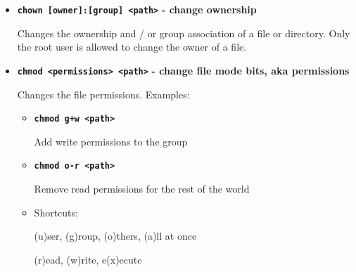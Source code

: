 \documentclass[aspectratio=1610]{beamer}
\newcommand\curtitle{}
\newenvironment{shells}[1]{
    \begin{tikzpicture}[codebox/.append style={text width=#1-18pt}]
        \coordinate (code);
}{
    \end{tikzpicture}
}
\newcommand\command[1]{\alert{\textbf{\texttt{#1}}}}
\begin{document}

\begin{frame}[c]{\curtitle}
    \begin{itemize}[<+->]\setlength\itemsep{1em}
        \item \command{chown [owner]:[group] <path>} \textbf{- change ownership} 


            Changes the ownership and / or group association of a file or directory. Only the
            \alert{root} user is allowed to change the owner of a file.

        \item \command{chmod <permissions> <path>} \textbf{- change file mode bits, aka permissions} 

            Changes the file permissions. Examples:
            \begin{itemize}[<.->]
                \item \command{chmod g+w <path>}

                    Add write permissions to the group
                \item \command{chmod o-r <path>}

                    Remove read permissions for the rest of the world
                \item Shortcuts:

                    (u)ser, (g)roup, (o)thers, (a)ll at once

                    (r)ead, (w)rite, e(x)ecute
            \end{itemize}
    \end{itemize}
\end{frame}


\end{document}
